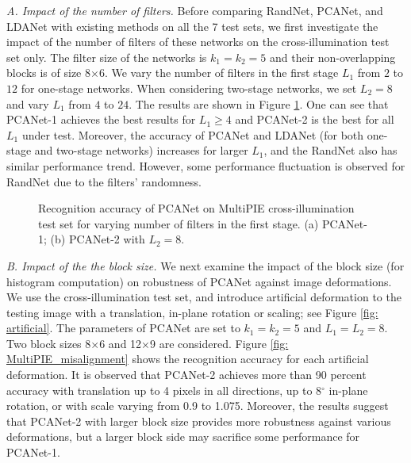\documentclass[10pt,journal,compsoc]{IEEEtran}
\begin{document}
\vspace{0.3\baselineskip}
{\em A. Impact of the number of filters.} Before comparing RandNet, PCANet, and LDANet with existing methods on all the 7 test sets, we first investigate the impact of the number of filters of these networks on the cross-illumination test set only. The filter size of the networks is $k_1 = k_2 = 5$ and their non-overlapping blocks is of size 8$\times$6. We vary the number of filters in the first stage $L_1$ from $2$ to $12$ for one-stage networks. When considering two-stage networks, we set $L_2=8$ and vary $L_1$ from $4$ to $24$. The results are shown in Figure \ref{fig: MultiPIE_K1}. One can see that PCANet-1 achieves the best results for $L_1 \geq 4$ and PCANet-2 is the best for all $L_1$ under test. Moreover, the accuracy of PCANet and LDANet (for both one-stage and two-stage networks) increases for larger $L_1$, and the RandNet also has similar performance trend. However, some performance fluctuation is observed for RandNet due to the filters' randomness.


\begin{figure}[t]
\centering
{}\hspace{0cm} 
\caption{Recognition accuracy of PCANet on MultiPIE cross-illumination test set for varying number of filters in the first stage. (a) PCANet-1; (b) PCANet-2 with $L_2 = 8$.}\label{fig: MultiPIE_K1}
\end{figure}

\vspace{0.3\baselineskip}
{\em B. Impact of the the block size.} We next examine the impact of the block size (for histogram computation) on robustness of PCANet against image deformations. We use the cross-illumination test set, and introduce artificial deformation to the testing image with a translation, in-plane rotation or scaling; see Figure \ref{fig: artificial}. The parameters of PCANet are set to $k_1 = k_2 = 5$ and $L_1 = L_2 = 8$. Two block sizes 8$\times$6 and 12$\times$9 are considered. Figure \ref{fig: MultiPIE_misalignment} shows the recognition accuracy for each artificial deformation. It is observed that PCANet-2 achieves more than 90 percent accuracy with translation up to 4 pixels in all directions, up to 8$^\circ$ in-plane rotation, or with scale varying from 0.9 to 1.075. Moreover, the results suggest that PCANet-2 with larger block size provides more robustness against various deformations, but a larger block side may sacrifice some performance for PCANet-1.
\end{document}
